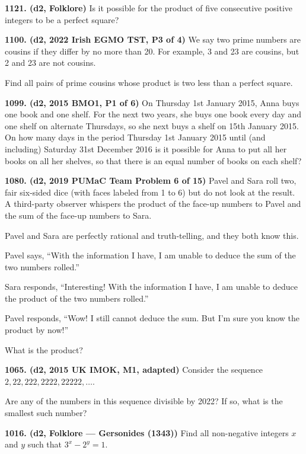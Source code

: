 \documentclass{article}
\begin{document}
\textbf{1121. (\color{red}d2\color{black}, Folklore)} Is it possible for the product of five consecutive positive integers to be a perfect square?

\textbf{1100. (\color{red}d2\color{black}, 2022 Irish EGMO TST, P3 of 4)} We say two prime numbers are cousins if they differ by no more than 20. For example, 3 and 23 are cousins, but 2 and 23 are not cousins.

Find all pairs of prime cousins whose product is two less than a perfect square.

\textbf{1099. (\color{red}d2\color{black}, 2015 BMO1, P1 of 6)} On Thursday 1st January 2015, Anna buys one book and one shelf. For the next two years, she buys one book every day and one shelf on alternate Thursdays, so she next buys a shelf on 15th January 2015. On how many days in the period Thursday 1st January 2015 until (and including) Saturday 31st December 2016 is it possible for Anna to put all her books on all her shelves, so that there is an equal number of books on each shelf?

\textbf{1080. (\color{red}d2\color{black}, 2019 PUMaC Team Problem 6 of 15)} Pavel and Sara roll two, fair six-sided dice (with faces labeled from 1 to 6) but do not look at the result. A third-party observer whispers the product of the face-up numbers to Pavel and the sum of the face-up numbers to Sara.

\makebox[1.5em]{}Pavel and Sara are perfectly rational and truth-telling, and they both know this.

\makebox[1.5em]{}Pavel says, ``With the information I have, I am unable to deduce the sum of the two numbers rolled.”

\makebox[1.5em]{}Sara responds, ``Interesting! With the information I have, I am unable to deduce the product of the two numbers rolled.”

\makebox[1.5em]{}Pavel responds, ``Wow! I still cannot deduce the sum. But I'm sure you know the product by now!”

\makebox[1.5em]{}What is the product?

\textbf{1065. (\color{red}d2\color{black}, 2015 UK IMOK, M1, adapted)} Consider the sequence $2, 22, 222, 2222, 22222, \ldots$.

Are any of the numbers in this sequence divisible by 2022? If so, what is the smallest such number?

\textbf{1016. (\color{red}d2\color{black}, Folklore — Gersonides (1343))} Find all non-negative integers $x$ and $y$ such that $3^x - 2^y = 1$.
\end{document}
